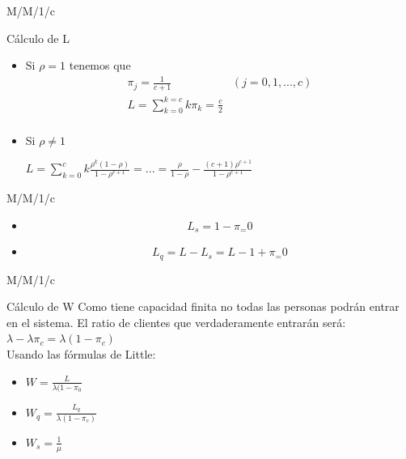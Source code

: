 \begin{frame}{M/M/1/c}
		\begin{block}{Cálculo de L}
	\begin{itemize}
		\item  Si $\rho=1$ tenemos que  \pause
		$$\begin{array}{cc}
		\pi_j=\frac{1}{c+1} & (j=0,1,...,c)\\ 
		
		L=\sum_{k=0}^{k=c}k\pi_k=\frac{c}{2}& \\
		\end{array}$$ \pause
		
		\item Si $\rho\neq1$ \pause
		\begin{center}
			$L=\sum_{k=0}^{c}k\frac{\rho^k (1-\rho)}{1-\rho^{c+1}}=...=\frac{\rho}{1-\rho}-\frac{(c+1)\rho^{c+1}}{1-\rho^{c+1}}$
		\end{center}
	
		\end{itemize}
	\end{block}
\end{frame}
\begin{frame}{M/M/1/c}
	
	\begin{itemize}
	\item 	$$L_s=1-\pi_=0$$  \pause
	\item  $$L_q=L-L_s=L-1+\pi_=0$$
	\end{itemize}
\end{frame}
\begin{frame}{M/M/1/c}
		\begin{block}{Cálculo de W}
	Como tiene capacidad finita no todas las personas podrán entrar en el sistema. El ratio de clientes que verdaderamente entrarán será:
	\pause
	\\
	 $\lambda-\lambda\pi_c=\lambda(1-\pi_c)$ \pause
	 \\
	 Usando las fórmulas de Little:
	\begin{itemize}
		\item $W=\frac{L}{\lambda(1-\pi_0}$ \pause
		\item $W_q=\frac{L_q}{\lambda(1-\pi_c)}$ \pause
		\item $W_s=\frac{1}{\mu}$ \pause
	\end{itemize}
\end{block}
\end{frame}